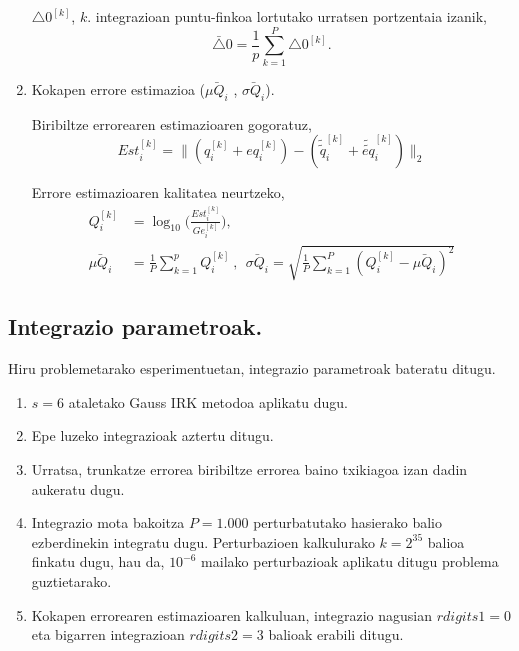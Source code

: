 \begin{enumerate}
$\triangle0^{[k]}$,  $k.$ integrazioan puntu-finkoa lortutako urratsen portzentaia izanik,           
\begin{equation*}
\bar{\triangle}0= \frac{1}{p}\sum_{k=1}^{P}\triangle0^{[k]}.
\end{equation*}
 
\item Kokapen errore estimazioa ($\bar{\mu Q_i}$ , $\bar{\sigma Q_i}$). 
            
Biribiltze errorearen estimazioaren gogoratuz, 
\begin{equation}
Est_i^{[k]}=\|(q_i^{[k]}+eq_{i}^{[k]})-(\tilde{\tilde{q}}_i^{[k]}+\tilde{\tilde{eq}}_{i}^{[k]})\|_2
\end{equation}
            
Errore estimazioaren kalitatea neurtzeko,
\begin{align} \label{eq:eq_Qi}
Q_i^{[k]} &=\log_{10} \bigg(\frac{Est^{[k]}_i}{Ge^{[k]}_i}\bigg),\\
\bar{\mu Q_i} &=\frac{1}{P}\sum_{k=1}^{p} Q_i^{[k]} \ , \ \ 
 \bar{\sigma Q_i}=\sqrt{\frac{1}{P}\sum_{k=1}^{P} (Q_i^{[k]}-\bar{\mu Q_i})^2}
\end{align}

\end{enumerate} 

\subsection{Integrazio parametroak.}

Hiru problemetarako esperimentuetan, integrazio parametroak bateratu ditugu. 

\begin{enumerate}

\item $s=6$ ataletako Gauss IRK metodoa aplikatu dugu.

\item Epe luzeko integrazioak aztertu ditugu.

\item Urratsa, trunkatze errorea biribiltze errorea baino txikiagoa izan dadin aukeratu dugu. 

\item Integrazio mota bakoitza $P=1.000$ perturbatutako hasierako balio ezberdinekin integratu dugu. Perturbazioen kalkulurako $k=2^35$ balioa finkatu dugu, hau da, $10^{-6}$ mailako perturbazioak aplikatu ditugu problema guztietarako.  

\item Kokapen errorearen estimazioaren kalkuluan, integrazio nagusian $rdigits1=0$ eta bigarren integrazioan $rdigits2=3$ balioak erabili ditugu.

\end{enumerate}


